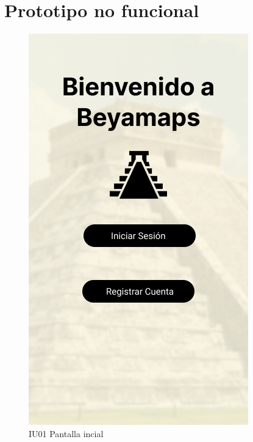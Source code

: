 \section{\textcolor{azul}{Prototipo no funcional}}
\begin{figure}[h]
    \begin{minipage}{0.4\textwidth}
        \centering
        \includegraphics[width=.7\linewidth]{Pantallas Prototipo3/IU01 Pantalla incial.jpg}
        \caption{IU01 Pantalla incial}
    \end{minipage}
    

\end{figure}
